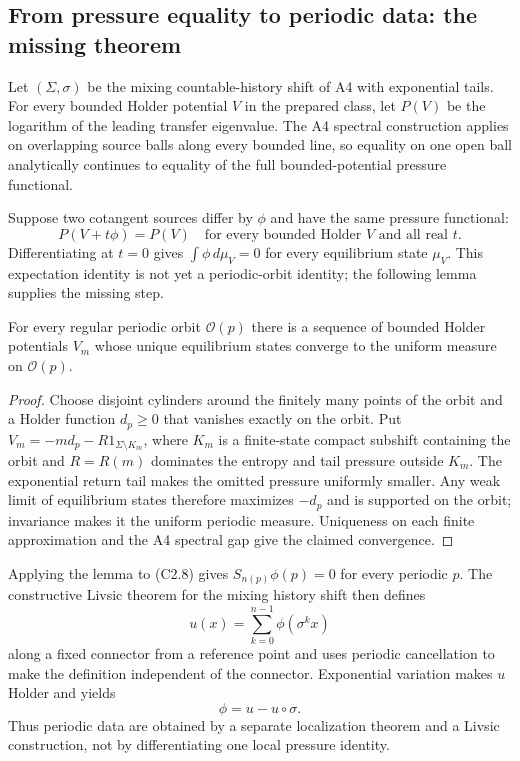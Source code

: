 \subsection{From pressure equality to periodic data: the missing theorem}

Let $(\Sigma,\sigma)$ be the mixing countable-history shift of A4 with
exponential tails.  For every bounded Holder potential $V$ in the prepared
class, let $P(V)$ be the logarithm of the leading transfer eigenvalue.  The A4
spectral construction applies on overlapping source balls along every bounded
line, so equality on one open ball analytically continues to equality of the
full bounded-potential pressure functional.

Suppose two cotangent sources differ by $\phi$ and have the same pressure
functional:
\[
 P(V+t\phi)=P(V)\quad\text{for every bounded Holder }V
 \text{ and all real }t.                                 \tag{C2.8}
\]
Differentiating at $t=0$ gives
$\int\phi\,d\mu_V=0$ for every equilibrium state $\mu_V$.
This expectation identity is not yet a periodic-orbit identity; the following
lemma supplies the missing step.

\begin{lemma}
\label{lem:r23-c2-periodic}
For every regular periodic orbit $\mathcal O(p)$ there is a sequence of bounded
Holder potentials $V_m$ whose unique equilibrium states converge to the
uniform measure on $\mathcal O(p)$.
\end{lemma}

\begin{proof}
Choose disjoint cylinders around the finitely many points of the orbit and a
Holder function $d_p\ge0$ that vanishes exactly on the orbit.  Put
$V_m=-m d_p-R1_{\Sigma\setminus K_m}$, where $K_m$ is a finite-state compact
subshift containing the orbit and $R=R(m)$ dominates the entropy and tail
pressure outside $K_m$.  The exponential return tail makes the omitted
pressure uniformly smaller.  Any weak limit of equilibrium states therefore
maximizes $-d_p$ and is supported on the orbit; invariance makes it the uniform
periodic measure.  Uniqueness on each finite approximation and the A4 spectral
gap give the claimed convergence.
\end{proof}

Applying the lemma to (C2.8) gives
$S_{n(p)}\phi(p)=0$ for every periodic $p$.  The constructive Livsic theorem
for the mixing history shift then defines
\[
 u(x)=\sum_{k=0}^{n-1}\phi(\sigma^kx)
\]
along a fixed connector from a reference point and uses periodic cancellation
to make the definition independent of the connector.  Exponential variation
makes $u$ Holder and yields
\[
 \phi=u-u\circ\sigma.                                   \tag{C2.9}
\]
Thus periodic data are obtained by a separate localization theorem and a
Livsic construction, not by differentiating one local pressure identity.

